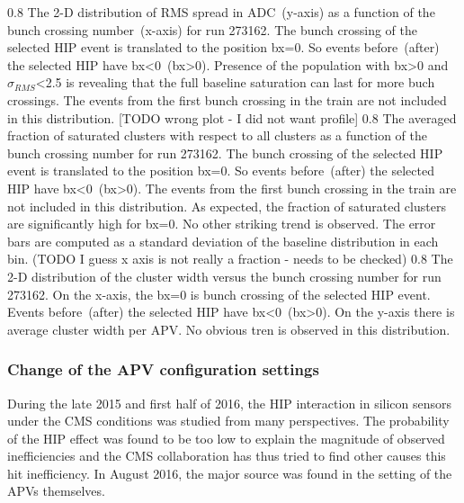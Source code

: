                  {0.8}       %
                 {The 2-D distribution of RMS spread in ADC~(y-axis) as a function of the bunch crossing number~(x-axis) for run 273162. The bunch crossing of the selected HIP event is translated to the position bx=0. So events before~(after) the selected HIP have bx<0~(bx>0). Presence of the population with bx>0 and $\sigma_{RMS}$<2.5 is revealing that the full baseline saturation can last for more buch crossings. The events from the first bunch crossing in the train are not included in this distribution. [TODO wrong plot - I did not want profile] } %
                 {0.8}       %
                 {The averaged fraction of saturated clusters with respect to all clusters as a function of the bunch crossing  number for run 273162. The bunch crossing of the selected HIP event is translated to the position bx=0. So events before~(after) the selected HIP have bx<0~(bx>0). The events from the first bunch crossing in the train are not included in this distribution. As expected, the fraction of saturated clusters are significantly high for bx=0. No other striking trend is observed. The error bars are computed as a standard deviation of the baseline distribution in each bin.  (TODO I guess x axis is not really a fraction - needs to be checked) } %
                 {0.8}       %
                 {The 2-D distribution of the cluster width versus the bunch crossing number for run 273162. On the x-axis, the bx=0 is bunch crossing of the selected HIP event. Events before~(after) the selected HIP have bx<0~(bx>0). On the y-axis there is average cluster width per APV. No obvious tren is observed in this distribution. } %


\subsubsection{Change of the APV configuration settings}

During the late 2015 and first half of 2016, the HIP interaction in silicon sensors under the CMS conditions was studied from many perspectives. The probability of the HIP effect was found to be too low to explain the magnitude of observed inefficiencies and the CMS collaboration has thus tried to find other causes this hit inefficiency. In August 2016, the major source was found in the setting of the APVs themselves.

